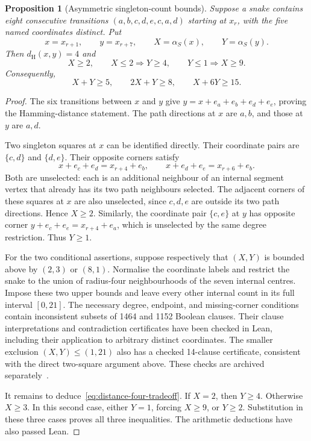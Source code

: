 \documentclass[11pt,a4paper]{article}
\newtheorem{proposition}[theorem]{Proposition}
\theoremstyle{definition}
\theoremstyle{remark}
\newcommand{\Ham}{d_{\mathrm H}}
\begin{document}
\begin{proposition}[Asymmetric singleton-count bounds]\label{prop:distance-four}
Suppose a snake contains eight consecutive transitions $(a,b,c,d,e,c,a,d)$ starting at $x_r$, with the five named coordinates distinct. Put
\[
x=x_{r+1},\qquad y=x_{r+7},\qquad X=\alpha_S(x),\qquad Y=\alpha_S(y).
\]
Then $\Ham(x,y)=4$ and
\[
X\ge2,\qquad X\le2\Longrightarrow Y\ge4,\qquad
Y\le1\Longrightarrow X\ge9.
\]
Consequently,
\begin{equation}\label{eq:distance-four-tradeoff}
X+Y\ge5,\qquad 2X+Y\ge8,\qquad X+6Y\ge15.
\end{equation}
\end{proposition}
\begin{proof}
The six transitions between $x$ and $y$ give $y=x+e_a+e_b+e_d+e_e$, proving the Hamming-distance statement. The path directions at $x$ are $a,b$, and those at $y$ are $a,d$.

Two singleton squares at $x$ can be identified directly. Their coordinate pairs are $\{c,d\}$ and $\{d,e\}$. Their opposite corners satisfy
\[
x+e_c+e_d=x_{r+4}+e_b,\qquad
x+e_d+e_e=x_{r+6}+e_b.
\]
Both are unselected: each is an additional neighbour of an internal segment vertex that already has its two path neighbours selected. The adjacent corners of these squares at $x$ are also unselected, since $c,d,e$ are outside its two path directions. Hence $X\ge2$. Similarly, the coordinate pair $\{c,e\}$ at $y$ has opposite corner $y+e_c+e_e=x_{r+4}+e_a$, which is unselected by the same degree restriction. Thus $Y\ge1$.

For the two conditional assertions, suppose respectively that $(X,Y)$ is bounded above by $(2,3)$ or $(8,1)$. Normalise the coordinate labels and restrict the snake to the union of radius-four neighbourhoods of the seven internal centres. Impose these two upper bounds and leave every other internal count in its full interval $[0,21]$. The necessary degree, endpoint, and missing-corner conditions contain inconsistent subsets of 1464 and 1152 Boolean clauses. Their clause interpretations and contradiction certificates have been checked in Lean, including their application to arbitrary distinct coordinates. The smaller exclusion $(X,Y)\le(1,21)$ also has a checked 14-clause certificate, consistent with the direct two-square argument above. These checks are archived separately~\cite{pairarchive}.

It remains to deduce~\eqref{eq:distance-four-tradeoff}. If $X=2$, then $Y\ge4$. Otherwise $X\ge3$. In this second case, either $Y=1$, forcing $X\ge9$, or $Y\ge2$. Substitution in these three cases proves all three inequalities. The arithmetic deductions have also passed Lean.
\end{proof}
\end{document}

